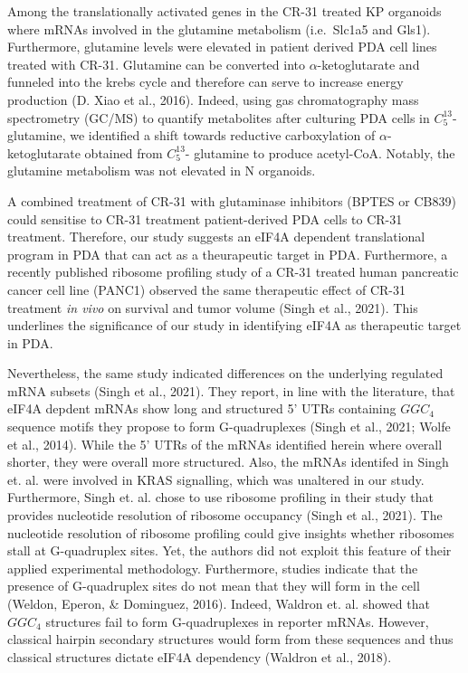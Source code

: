 \documentclass[12pt,openany]{book}
\begin{document}
Among the translationally activated genes in the CR-31 treated KP
organoids where mRNAs involved in the glutamine metabolism (i.e.~Slc1a5
and Gls1). Furthermore, glutamine levels were elevated in patient
derived PDA cell lines treated with CR-31. Glutamine can be converted
into \(\alpha\)-ketoglutarate and funneled into the krebs cycle and
therefore can serve to increase energy production (D. Xiao et al.,
2016). Indeed, using gas chromatography mass spectrometry (GC/MS) to
quantify metabolites after culturing PDA cells in \(C_5^{13}\)-
glutamine, we identified a shift towards reductive carboxylation of
\(\alpha\)-ketoglutarate obtained from \(C_5^{13}\)- glutamine to
produce acetyl-CoA. Notably, the glutamine metabolism was not elevated
in N organoids.

A combined treatment of CR-31 with glutaminase inhibitors (BPTES or
CB839) could sensitise to CR-31 treatment patient-derived PDA cells to
CR-31 treatment. Therefore, our study suggests an eIF4A dependent
translational program in PDA that can act as a theurapeutic target in
PDA. Furthermore, a recently published ribosome profiling study of a
CR-31 treated human pancreatic cancer cell line (PANC1) observed the
same therapeutic effect of CR-31 treatment \emph{in vivo} on survival
and tumor volume (Singh et al., 2021). This underlines the significance
of our study in identifying eIF4A as therapeutic target in PDA.

Nevertheless, the same study indicated differences on the underlying
regulated mRNA subsets (Singh et al., 2021). They report, in line with
the literature, that eIF4A depdent mRNAs show long and structured 5'
UTRs containing \(GGC_4\) sequence motifs they propose to form
G-quadruplexes (Singh et al., 2021; Wolfe et al., 2014). While the 5'
UTRs of the mRNAs identified herein where overall shorter, they were
overall more structured. Also, the mRNAs identifed in Singh et. al. were
involved in KRAS signalling, which was unaltered in our study.
Furthermore, Singh et. al. chose to use ribosome profiling in their
study that provides nucleotide resolution of ribosome occupancy (Singh
et al., 2021). The nucleotide resolution of ribosome profiling could
give insights whether ribosomes stall at G-quadruplex sites. Yet, the
authors did not exploit this feature of their applied experimental
methodology. Furthermore, studies indicate that the presence of
G-quadruplex sites do not mean that they will form in the cell (Weldon,
Eperon, \& Dominguez, 2016). Indeed, Waldron et. al. showed that
\(GGC_4\) structures fail to form G-quadruplexes in reporter mRNAs.
However, classical hairpin secondary structures would form from these
sequences and thus classical structures dictate eIF4A dependency
(Waldron et al., 2018).
\end{document}
